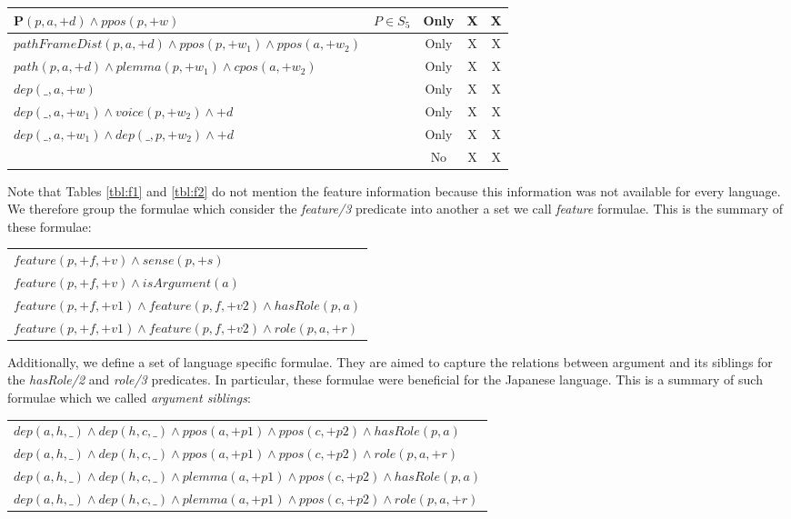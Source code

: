 \begin{table*}[th]
\begin{tabular}{|p{11cm}|c|c|c|c|}
   $ \mathbf{P}(p,a,+d) \land ppos(p,+w) $ & $P \in S_5$   & Only        & X & X \\\hline
   $ pathFrameDist(p,a,+d) \land ppos(p,+w_1) \land ppos(a,+w_2) $ &  & Only           & X & X \\\hline
   $ path(p,a,+d) \land plemma(p,+w_1) \land cpos(a,+w_2) $ &  & Only          & X & X \\\hline
   $ dep(\_,a,+w)$  & & Only  & X & X \\\hline
   $ dep(\_,a,+w_1) \land voice(p,+w_2) \land +d$    &  & Only & X & X  \\\hline
   $ dep(\_,a,+w_1) \land dep(\_,p,+w_2) \land +d$    & & Only & X & X  \\\hline
   $                 $    &                           & No & X & X \\
\hline
\end{tabular}
\caption{Templates of the local formulae for \emph{hasRole/2} and 
\emph{role/3}. H: head of clause is $hasRole(p,a)$, R: head of clause is 
$role(p,a,+r)$ and $S_1 = \{ppos,plemma\}, S_2=\{frame, unlabelFrame, path\}, S_3= \{frame,pathFrame\},S_4=\{frame,pathFrame,path\}, S_5= \{pathFrameDist, path\} $}
\label{tbl:f2}
\end{table*}

Note that Tables \ref{tbl:f1} and \ref{tbl:f2} do not mention the feature information because 
this information was not available for every language. We therefore group the 
formulae which consider the \emph{feature/3} predicate into another a set we call 
\emph{feature} formulae. This is the summary of these formulae:
\begin{tabular}{p{7.0cm}}
   $ feature(p,+f,+v) \land sense(p,+s)    $\\
   $ feature(p,+f,+v) \land isArgument(a)    $\\
   $ feature(p,+f,+v1) \land feature(p,f,+v2) \land hasRole(p,a)    $\\
   $ feature(p,+f,+v1) \land feature(p,f,+v2) \land role(p,a,+r)   $\\
\end{tabular}


Additionally, we define a set of language specific formulae. They are aimed to 
capture the relations between argument and its siblings for the \emph{hasRole/2} 
and \emph{role/3} predicates.  In particular, these formulae were beneficial for 
the Japanese language.  This is a summary of such formulae which we called 
\emph{argument siblings}:
\begin{tabular}{p{7.0cm}}
   $ dep(a,h,\_) \land dep(h,c,\_) \land ppos(a,+p1) \land ppos(c,+p2) \land hasRole(p,a)    $\\
   $ dep(a,h,\_) \land dep(h,c,\_) \land ppos(a,+p1) \land ppos(c,+p2) \land role(p,a,+r)    $\\
   $ dep(a,h,\_) \land dep(h,c,\_) \land plemma(a,+p1) \land ppos(c,+p2) \land hasRole(p,a)    $\\
   $ dep(a,h,\_) \land dep(h,c,\_) \land plemma(a,+p1) \land ppos(c,+p2) \land role(p,a,+r)    $\\
\end{tabular}

